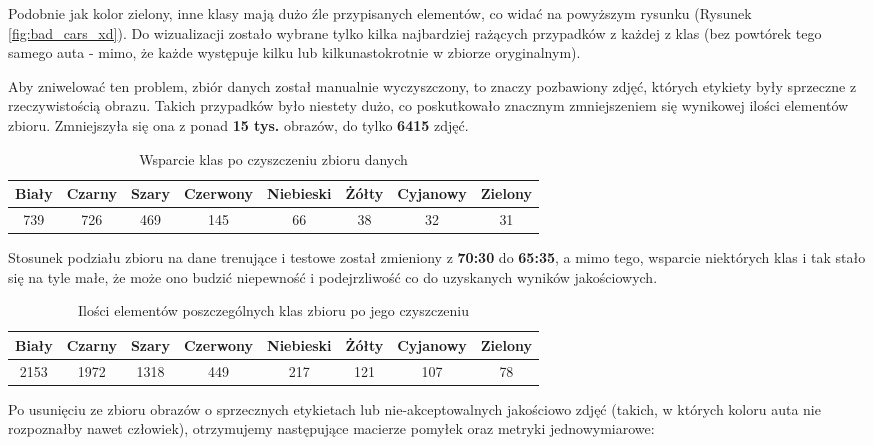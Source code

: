 Podobnie jak kolor zielony, inne klasy mają dużo źle przypisanych elementów, co widać na powyższym rysunku (Rysunek \ref{fig:bad_cars_xd}). Do wizualizacji zostało wybrane tylko kilka najbardziej rażących przypadków z każdej z klas (bez powtórek tego samego auta - mimo, że każde występuje kilku lub kilkunastokrotnie w zbiorze oryginalnym).

Aby zniwelować ten problem, zbiór danych został manualnie wyczyszczony, to znaczy pozbawiony zdjęć, których etykiety były sprzeczne z rzeczywistością obrazu. Takich przypadków było niestety dużo, co poskutkowało znacznym zmniejszeniem się wynikowej ilości elementów zbioru. Zmniejszyła się ona z ponad \textbf{15 tys.} obrazów, do tylko \textbf{6415} zdjęć.

\begin{table}[h!]
\begin{center}
\begin{tabular}{|c|c|c|c|c|c|c|c|}
\hline
Biały & Czarny & Szary & Czerwony & Niebieski & Żółty & Cyjanowy & Zielony \\ \hline
739   & 726    & 469   & 145      & 66        & 38    & 32       & 31      \\ \hline
\end{tabular}
\caption{Wsparcie klas po czyszczeniu zbioru danych}
\label{tab:support_reword}
\end{center}
\end{table}

Stosunek podziału zbioru na dane trenujące i testowe został zmieniony z \textbf{70:30} do \textbf{65:35}, a mimo tego, wsparcie niektórych klas i tak stało się na tyle małe, że może ono budzić niepewność i podejrzliwość co do uzyskanych wyników jakościowych.

\begin{table}[h!]
\begin{center}
\begin{tabular}{|c|c|c|c|c|c|c|c|}
\hline
Biały & Czarny & Szary & Czerwony & Niebieski & Żółty & Cyjanowy & Zielony \\ \hline
2153  & 1972   & 1318  & 449      & 217       & 121   & 107      & 78      \\ \hline
\end{tabular}
\caption{Ilości elementów poszczególnych klas zbioru po jego czyszczeniu}
\label{tab:dataset_count_reword}
\end{center}
\end{table}

Po usunięciu ze zbioru obrazów o sprzecznych etykietach lub nie-akceptowalnych jakościowo zdjęć (takich, w których koloru auta nie rozpoznałby nawet człowiek), otrzymujemy następujące macierze pomyłek oraz metryki jednowymiarowe:

